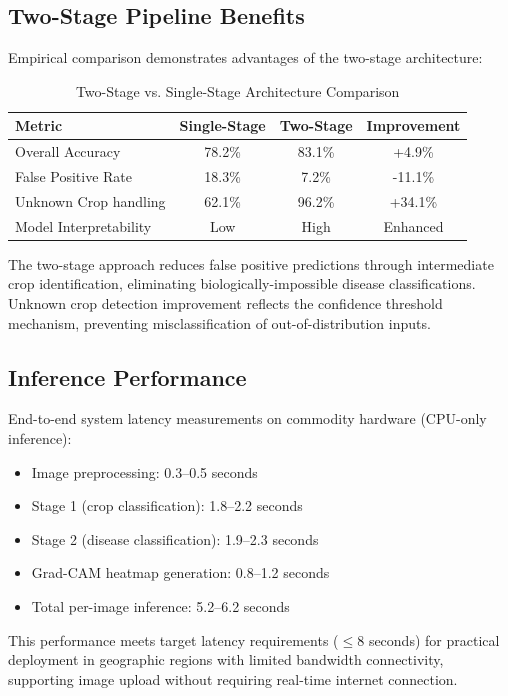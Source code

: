 \documentclass[conference]{IEEEtran}
\begin{document}
\subsection{Two-Stage Pipeline Benefits}

Empirical comparison demonstrates advantages of the two-stage architecture:

\begin{table}[H]
\centering
\renewcommand{\arraystretch}{1.3}
\begin{tabular}{|l|c|c|c|}
\hline
\textbf{Metric} & \textbf{Single-Stage} & \textbf{Two-Stage} & \textbf{Improvement} \\
\hline
Overall Accuracy & 78.2\% & 83.1\% & +4.9\% \\
False Positive Rate & 18.3\% & 7.2\% & -11.1\% \\
Unknown Crop handling & 62.1\% & 96.2\% & +34.1\% \\
Model Interpretability & Low & High & Enhanced \\
\hline
\end{tabular}
\caption{Two-Stage vs. Single-Stage Architecture Comparison}
\label{tab:pipeline_comp}
\end{table}

The two-stage approach reduces false positive predictions through intermediate crop identification, eliminating biologically-impossible disease classifications. Unknown crop detection improvement reflects the confidence threshold mechanism, preventing misclassification of out-of-distribution inputs.

\subsection{Inference Performance}

End-to-end system latency measurements on commodity hardware (CPU-only inference):

\begin{itemize}
\item Image preprocessing: 0.3--0.5 seconds
\item Stage 1 (crop classification): 1.8--2.2 seconds
\item Stage 2 (disease classification): 1.9--2.3 seconds
\item Grad-CAM heatmap generation: 0.8--1.2 seconds
\item Total per-image inference: 5.2--6.2 seconds
\end{itemize}

This performance meets target latency requirements ($\leq 8$ seconds) for practical deployment in geographic regions with limited bandwidth connectivity, supporting image upload without requiring real-time internet connection.
\end{document}
